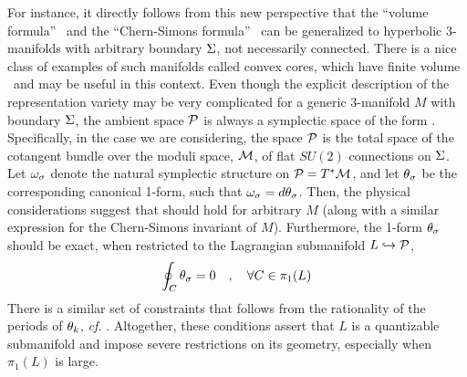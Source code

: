 %

For instance, it directly follows from this new perspective
that the ``volume formula'' \volfla\ and
the ``Chern-Simons formula'' \csfla\ can be generalized
to hyperbolic 3-manifolds with arbitrary boundary ${\Sigma}$,
not necessarily connected.
There is a nice class of examples of such manifolds
called convex cores, which have finite volume \Bonahon\
and may be useful in this context.
Even though the explicit description of
the representation variety
%
\eqn{}
%
may be very complicated for a generic 
3-manifold $M$ with boundary ${\Sigma}$, the ambient space ${\cal P}$
is always a symplectic space of the form \pmcot.
Specifically, in the case we are considering, the space ${\cal P}$
is the total space of the cotangent bundle over
the moduli space, ${\cal M}$, of flat $SU(2)$ connections on ${\Sigma}$.
Let $\omega_{\sigma}$ denote the natural symplectic structure
on ${\cal P} = T^* {\cal M}$, and let $\theta_{\sigma}$ be the corresponding
canonical 1-form, such that $\omega_{\sigma} = d \theta_{\sigma}$.
Then, the physical considerations suggest that
%
\eqn{}
%
should hold for arbitrary $M$ (along with a similar
expression for the Chern-Simons invariant of $M$).
Furthermore, the 1-form $\theta_{\sigma}$ should be exact, when
restricted to the Lagrangian submanifold $L \hookrightarrow {\cal P}$,
$$
\oint_C \theta_{\sigma} = 0 \quad, \quad \forall C \in \pi_1 (L)
$$
There is a similar set of constraints that follows from
the rationality of the periods of $\theta_k$, {\it cf.} \ksquantcond.
Altogether, these conditions assert that $L$ is a quantizable
submanifold and impose severe restrictions on its geometry,
especially when $\pi_1 (L)$ is large.

